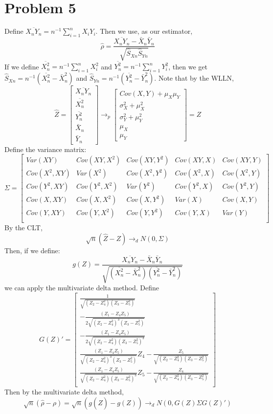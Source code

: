 \documentclass[10pt,letter]{article}
\begin{document}
\section*{Problem 5}
Define $\overline{X_nY_n} = n^{-1}\sum_{i=1}^n X_iY_i$.
Then we use, as our estimator,
\[ \hat{\rho} = \frac{\overline{X_nY_n} - \bar{X}_n \bar{Y}_n} {\sqrt{\hat{S}_{Xn}\hat{S}_{Yn}}} \]
If we define $\overline{X^2_n} = n^{-1}\sum_{i=1}^n X_i^2$ and $\overline{Y^2_n} = n^{-1}\sum_{i=1}^n Y_i^2$, then we get $\hat{S}_{Xn} = n^{-1}(\overline{X^2_n} - \bar{X}_n^2)$ and $\hat{S}_{Yn} = n^{-1}(\overline{Y^2_n} - \bar{Y}_n^2)$.
Note that by the WLLN,
\[ \hat{Z} = \begin{bmatrix}
\overline{X_nY_n} \\
 \overline{X^2_n} \\
  \overline{Y^2_n} \\
  \bar{X}_n \\
  \bar{Y}_n
\end{bmatrix} \to_p  \begin{bmatrix}
Cov(X,Y) + \mu_X\mu_Y \\
 \sigma_X^2 + \mu_X^2 \\
  \sigma_Y^2 + \mu_Y^2\\
  \mu_X \\
  \mu_Y
\end{bmatrix} = Z  \]
Define the variance matrix:
\[ \Sigma = \begin{bmatrix}
Var(XY) & Cov(XY, X^2) & Cov(XY, Y^2) & Cov(XY, X) & Cov(XY, Y)\\
Cov(X^2, XY) & Var(X^2) & Cov(X^2, Y^2) & Cov(X^2, X) & Cov(X^2, Y)\\
Cov(Y^2, XY) & Cov(Y^2, X^2) & Var(Y^2) & Cov(Y^2, X) & Cov(Y^2, Y)\\
Cov(X, XY) & Cov(X, X^2) & Cov(X, Y^2) & Var(X) & Cov(X, Y)\\
Cov(Y, XY) & Cov(Y, X^2) & Cov(Y, Y^2) & Cov(Y, X) & Var(Y)\\

\end{bmatrix} \]
By the CLT,
\[ \sqrt{n}(\hat{Z} - Z) \to_d N(0,\Sigma)\]
Then, if we define:
\[ g(Z) = \frac{\overline{X_nY_n} - \bar{X}_n \bar{Y}_n} {\sqrt{(\overline{X^2_n} - \bar{X}_n^2)(\overline{Y^2_n} - \bar{Y}_n^2)}} \]
we can apply the multivariate delta method. Define
\[ G(Z)' = \begin{bmatrix}
\frac{1}{\sqrt{(Z_2 - Z_4^2)(Z_3 - Z_5^2)}} \\
-\frac{(Z_1 - Z_4Z_5)}{2\sqrt{(Z_2 - Z_4^2)^3(Z_3 - Z_5^2)}} \\
-\frac{(Z_1 - Z_4Z_5)}{2\sqrt{(Z_2 - Z_4^2)(Z_3 - Z_5^2)^3}} \\
\frac{(Z_1 - Z_4Z_5)}{\sqrt{(Z_2 - Z_4^2)^3(Z_3 - Z_5^2)}}Z_4 - \frac{Z_5} {\sqrt{(Z_2 - Z_4^2)(Z_3 - Z_5^2)}}  \\
\frac{(Z_1 - Z_4Z_5)}{\sqrt{(Z_2 - Z_4^2)(Z_3 - Z_5^2)^3}}Z_5 - \frac{Z_4} {\sqrt{(Z_2 - Z_4^2)(Z_3 - Z_5^2)}}  \\
\end{bmatrix} \]
Then by the multivariate delta method,
\[ \sqrt{n}(\hat{\rho} - \rho) = \sqrt{n}(g(\hat{Z}) - g(Z)) \to_d N(0, G(Z)\Sigma G(Z)') \]
\end{document}
